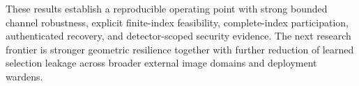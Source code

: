These results establish a reproducible operating point with strong bounded channel robustness, explicit finite-index feasibility, complete-index participation, authenticated recovery, and detector-scoped security evidence. The next research frontier is stronger geometric resilience together with further reduction of learned selection leakage across broader external image domains and deployment wardens.
